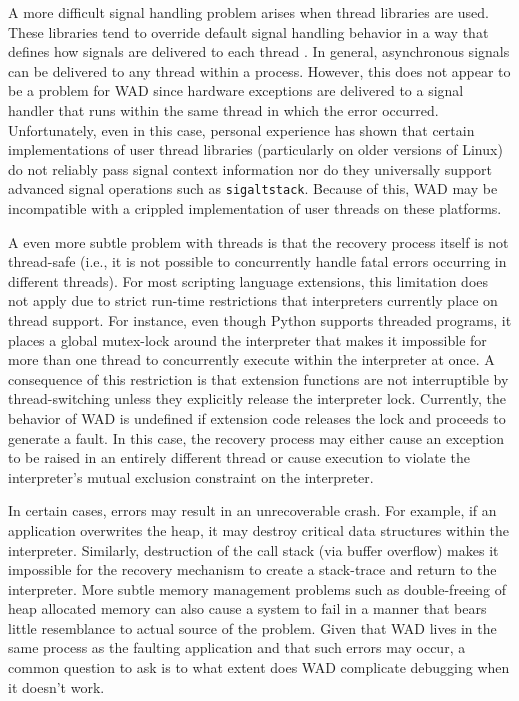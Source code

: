 A more difficult signal handling problem arises when thread libraries
are used. These libraries tend to override default signal handling
behavior in a way that defines how signals are delivered to each
thread \cite{thread}.  In general, asynchronous signals can be
delivered to any thread within a process.  However, this does not
appear to be a problem for WAD since hardware exceptions are delivered
to a signal handler that runs within the same thread in which the
error occurred.  Unfortunately, even in this case, personal experience has
shown that certain implementations of user thread libraries (particularly on older versions
of Linux) do not reliably pass
signal context information nor do they universally support advanced
signal operations such as {\tt sigaltstack}.  Because of this, WAD may
be incompatible with a crippled implementation of user threads on
these platforms.  

A even more subtle problem with threads is that the recovery process
itself is not thread-safe (i.e., it is not possible to concurrently
handle fatal errors occurring in different threads).  For most
scripting language extensions, this limitation does not apply due to
strict run-time restrictions that interpreters currently place on
thread support.  For instance, even though Python supports threaded
programs, it places a global mutex-lock around the interpreter that
makes it impossible for more than one thread to concurrently execute
within the interpreter at once. A consequence of this restriction is
that extension functions are not interruptible by thread-switching
unless they explicitly release the interpreter lock.  Currently, the
behavior of WAD is undefined if extension code releases the lock and
proceeds to generate a fault.  In this case, the recovery process may
either cause an exception to be raised in an entirely different
thread or cause execution to violate the interpreter's mutual exclusion
constraint on the interpreter.

In certain cases, errors may result in an unrecoverable crash.  For
example, if an application overwrites the heap, it may destroy
critical data structures within the interpreter.  Similarly,
destruction of the call stack (via buffer overflow) makes it
impossible for the recovery mechanism to create a stack-trace and
return to the interpreter.    More subtle memory management problems
such as double-freeing of heap allocated memory can also cause a system
to fail in a manner that bears little resemblance to actual source
of the problem.    Given that WAD lives in the same process as the
faulting application and that such errors may occur, a common
question to ask is to what extent does WAD complicate debugging when it
doesn't work.

